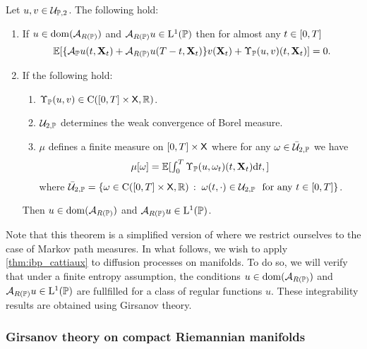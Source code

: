 \begin{theorem}
  \label{thm:ibp_cattiaux}
  Let $u, v \in \mathcal{U}_{\mathbb{P}, 2}$. The following hold:
  \begin{enumerate}[label= (\alph*),  wide, labelwidth=!, labelindent=0pt]    
  \item If
  $u \in \mathrm{dom}(\mathcal{A}_{R(\mathbb{P})})$ and
  $\mathcal{A}_{R(\mathbb{P})}u \in \mathrm{L}^1(\mathbb{P})$ then for almost any $t \in \left[0,T\right]$
  \begin{equation}
    \mathbb{E} [ \{\mathcal{A}_{\mathbb{P}} u(t, \mathbf{X}_t) + \mathcal{A}_{R(\mathbb{P})} u (T-t, \mathbf{X}_t)\}v(\mathbf{X}_t) + \Upsilon_{\mathbb{P}}(u,v)(t, \mathbf{X}_t) ] = 0  .       
  \end{equation}  
\item If the following hold:
  \begin{enumerate}[label=\roman*)]
  \item $\Upsilon_{\mathbb{P}}(u,v) \in \mathrm{C}(\left[0,T\right] \times \mathsf{X}, \mathbb{R})$.
  \item $\mathcal{U}_{2, \mathbb{P}}$ determines the weak convergence of Borel measure.
  \item $\mu$ defines a finite measure on $\left[0,T\right] \times \mathsf{X}$ where for
    any $\omega \in \bar{\mathcal{U}}_{2, \mathbb{P}}$ we have
    \begin{equation}
      \textstyle{\mu[\omega] = \mathbb{E}[ \int_0^T \Upsilon_{\mathbb{P}}(u,\omega_t)(t, \mathbf{X}_t) \mathrm{d}t  , ]}
    \end{equation}
    where
    $\bar{\mathcal{U}}_{2, \mathbb{P}} = \{\omega \in \mathrm{C}(\left[0,T\right]
      \times \mathsf{X}, \mathbb{R})\,:\; \omega(t, \cdot) \in \mathcal{U}_{2, \mathbb{P}}\ \
      \text{for any $t \in \left[0,T\right]$}\}$.
  \end{enumerate}
  Then $u \in \mathrm{dom}(\mathcal{A}_{R(\mathbb{P})})$ and
  $\mathcal{A}_{R(\mathbb{P})}u \in \mathrm{L}^1(\mathbb{P})$.
  \end{enumerate}
\end{theorem}

Note that this theorem is a simplified version of \citet[Theorem
3.17]{cattiaux2021time} where we restrict ourselves to the case of Markov path
measures. In what follows, we wish to apply \cref{thm:ibp_cattiaux} to diffusion
processes on manifolds. To do so, we will verify that under a finite entropy
assumption, the conditions $u \in \mathrm{dom}(\mathcal{A}_{R(\mathbb{P})})$ and
$\mathcal{A}_{R(\mathbb{P})}u \in \mathrm{L}^1(\mathbb{P})$ are fullfilled for a class of
regular functions $u$. These integrability results are obtained using Girsanov
theory.

\subsubsection{Girsanov theory on compact Riemannian manifolds}
\label{sec:girs-theory-comp}

